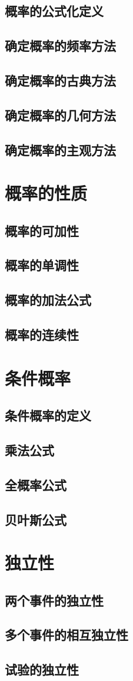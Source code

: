 \subsection{概率的公式化定义}
\subsection{确定概率的频率方法}
\subsection{确定概率的古典方法}
\subsection{确定概率的几何方法}
\subsection{确定概率的主观方法}

\section{概率的性质}
\subsection{概率的可加性}
\subsection{概率的单调性}
\subsection{概率的加法公式}
\subsection{概率的连续性}

\section{条件概率}
\subsection{条件概率的定义}
\subsection{乘法公式}
\subsection{全概率公式}
\subsection{贝叶斯公式}

\section{独立性}
\subsection{两个事件的独立性}
\subsection{多个事件的相互独立性}
\subsection{试验的独立性}